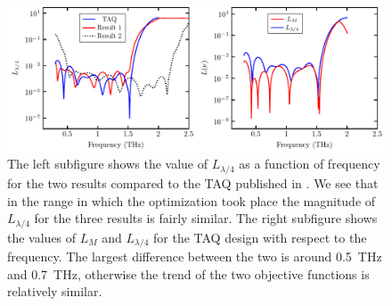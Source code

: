 \begin{figure}[H]
    \centering
    \includegraphics[scale=0.78]{images/results/plots/ceramic/loss_function.pdf}
    \caption{The left subfigure shows the value of $L_{\lambda/4}$ as a function of frequency for the two results compared to the TAQ published in \cite{Masson2006}. We see that in the range in which the optimization took place the magnitude of $L_{\lambda/4}$ for the three results is fairly similar. The right subfigure shows the values of $L_M$ and $L_{\lambda/4}$ for the TAQ design with respect to the frequency. The largest difference between the two is around \SI{0.5}{\tera \hertz} and \SI{0.7}{\tera \hertz}, otherwise the trend of the two objective functions is relatively similar.}
    \label{fig:loss_function_cl4}
\end{figure}

